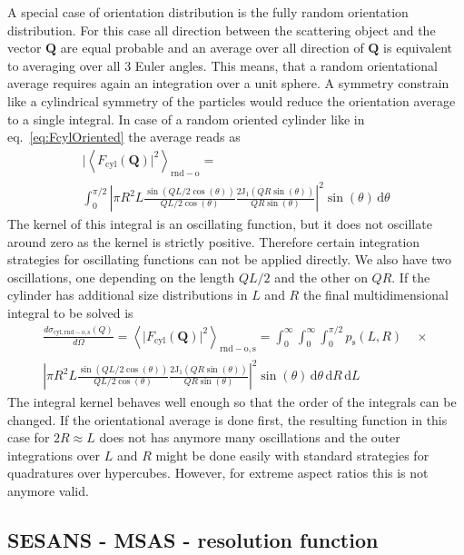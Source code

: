 A special case of orientation distribution is the fully random orientation distribution. For this case all direction between the scattering object and the vector $\mathbf{Q}$ are equal probable and an average over all direction of $\mathbf{Q}$ is equivalent to averaging over all 3 Euler angles. This means, that a random orientational average requires again an integration over a unit sphere. A symmetry constrain like a cylindrical symmetry of the particles would reduce the orientation average to a single integral. In case of a random oriented cylinder like in eq.\ \ref{eq:FcylOriented} the average reads as
\begin{multline}\label{eq.Fcyl_rndODF}
\vert\left\langle F_\mathrm{cyl}(\mathbf{Q})\vert^2\right\rangle_{\mathrm{rnd-o}} = \\
\int_0^{\pi/2} \left\vert \pi R^2L \frac{\sin(QL/2\cos(\theta))}{QL/2\cos(\theta)} \frac{2\textrm{J}_1(QR\sin(\theta))}{QR\sin(\theta)}\right\vert^2 \sin(\theta) \, \mathrm{d}\theta  \end{multline}
The kernel of this integral is an oscillating function, but it does not oscillate around zero as the kernel is strictly positive. Therefore certain integration strategies for oscillating functions can not be applied directly. We also have two oscillations, one depending on the length $QL/2$ and the other on $QR$. If the cylinder has additional size distributions in $L$ and $R$ the final multidimensional integral to be solved is
\begin{multline}\label{eq.Fcyl_rndODF}
\frac{d\sigma_{\mathrm{cyl},\mathrm{rnd-o},\mathrm{s}}(Q)}{d\Omega}=\left\langle \vert F_\mathrm{cyl}(\mathbf{Q})\vert^2\right\rangle_{\mathrm{rnd-o},\mathrm{s}} = \int_0^\infty \!\int_0^\infty \!\int_0^{\pi/2} p_\mathrm{s}(L,R) \quad \times\\
 \left\vert \pi R^2L \frac{\sin(QL/2\cos(\theta))}{QL/2\cos(\theta)} \frac{2\textrm{J}_1(QR\sin(\theta))}{QR\sin(\theta)}\right\vert^2 \sin(\theta) \, \mathrm{d}\theta  \, \mathrm{d}R\, \mathrm{d}L
\end{multline}
The integral kernel behaves well enough so that the order of the integrals can be changed. If the orientational average is done first, the resulting function in this case for $2R\approx L$ does not has anymore many oscillations and the outer integrations over $L$ and $R$ might be done easily with standard strategies for quadratures over hypercubes. However, for extreme aspect ratios this is not anymore valid.

\subsection{SESANS - MSAS - resolution function} ~\\
